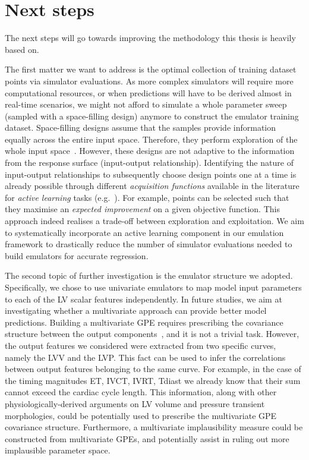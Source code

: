 %
%
%
\section{Next steps}\label{sec:ch9next_steps}
The next steps will go towards improving the methodology this thesis is heavily based on.

\vspace{0.2cm}
The first matter we want to address is the optimal collection of training dataset points via simulator evaluations. As more complex simulators will require more computational resources, or when predictions will have to be derived almost in real-time scenarios, we might not afford to simulate a whole parameter sweep (sampled with a space-filling design) anymore to construct the emulator training dataset. Space-filling designs assume that the samples provide information equally across the entire input space. Therefore, they perform exploration of the whole input space~\cite{Yue:2021}. However, these designs are not adaptive to the information from the response surface (input-output relationship). Identifying the nature of input-output relationships to subsequently choose design points one at a time is already possible through different \textit{acquisition functions} available in the literature for \textit{active learning} tasks (e.g.~\cite{Jones:1998,Pasolli:2011,Schreiter:2015}). For example, points can be selected such that they maximise an \textit{expected improvement} on a given objective function. This approach indeed realises a trade-off between exploration and exploitation. We aim to systematically incorporate an active learning component in our emulation framework to drastically reduce the number of simulator evaluations needed to build emulators for accurate regression.

\vspace{0.2cm}
The second topic of further investigation is the emulator structure we adopted. Specifically, we chose to use univariate emulators to map model input parameters to each of the LV scalar features independently. In future studies, we aim at investigating whether a multivariate approach can provide better model predictions. Building a multivariate GPE requires prescribing the covariance structure between the output components~\cite{Bonilla:2008,Rougier:2008,Conti:2010}, and it is not a trivial task. However, the output features we considered were extracted from two specific curves, namely the LVV and the LVP. This fact can be used to infer the correlations between output features belonging to the same curve. For example, in the case of the timing magnitudes ET, IVCT, IVRT, Tdiast we already know that their sum cannot exceed the cardiac cycle length. This information, along with other physiologically-derived arguments on LV volume and pressure transient morphologies, could be potentially used to prescribe the multivariate GPE covariance structure. Furthermore, a multivariate implausibility measure could be constructed from multivariate GPEs, and potentially assist in ruling out more implausible parameter space.

